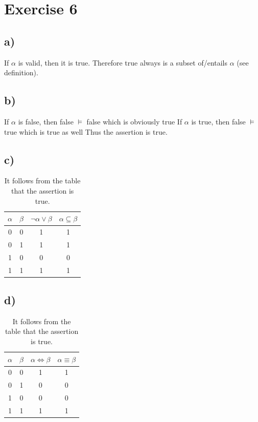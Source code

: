 \documentclass[11pt]{article}
\begin{document}
\newpage
\section*{Exercise 6}
\subsection*{a)}
If $\alpha$ is valid, then it is true. Therefore true always is a subset of/entails $\alpha$ (see definition).

\subsection*{b)}
If $\alpha$ is false, then false $\models$ false which is obviously true
If $\alpha$ is true, then false $\models$ true which is true as well
Thus the assertion is true.

\subsection*{c)}
\begin{table}[h]
  \begin{tabular}{c|c||c|c}
    $\alpha$ & $\beta$ & $\neg \alpha \vee \beta$ & $\alpha \subseteq \beta$\\
    \hline
    0 & 0 & 1 & 1\\
    0 & 1 & 1 & 1\\
    1 & 0 & 0 & 0\\
    1 & 1 & 1 & 1\\
  \end{tabular}
  \caption*{It follows from the table that the assertion is true.}
\end{table}

\subsection*{d)}
\begin{table}[h]
  \begin{tabular}{c|c||c|c}
    $\alpha$ & $\beta$ & $\alpha \Leftrightarrow \beta$ & $\alpha \equiv \beta$\\
    \hline
    0 & 0 & 1 & 1\\
    0 & 1 & 0 & 0\\
    1 & 0 & 0 & 0\\
    1 & 1 & 1 & 1\\
  \end{tabular}
  \caption*{It follows from the table that the assertion is true.}
\end{table}
\end{document}
